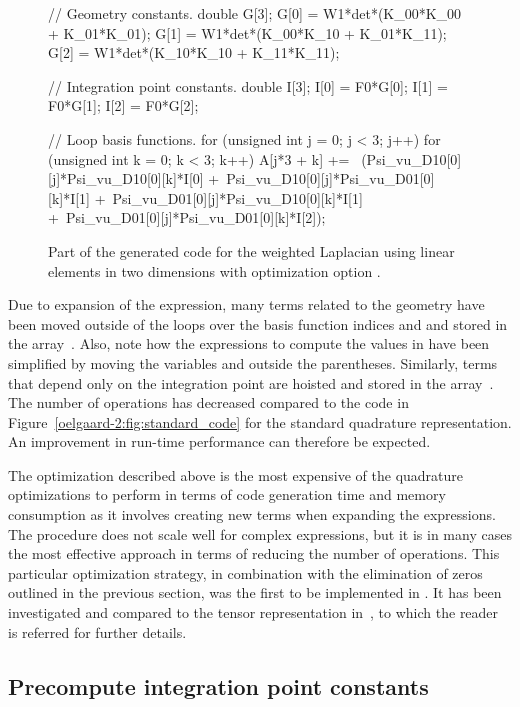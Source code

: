 \begin{figure}
\begin{c++}
// Geometry constants.
double G[3];
G[0] = W1*det*(K_00*K_00 + K_01*K_01);
G[1] = W1*det*(K_00*K_10 + K_01*K_11);
G[2] = W1*det*(K_10*K_10 + K_11*K_11);

// Integration point constants.
double I[3];
I[0] = F0*G[0];
I[1] = F0*G[1];
I[2] = F0*G[2];

// Loop basis functions.
for (unsigned int j = 0; j < 3; j++)
{
 for (unsigned int k = 0; k < 3; k++)
 {
  A[j*3 + k] += \
    (Psi_vu_D10[0][j]*Psi_vu_D10[0][k]*I[0] +\
     Psi_vu_D10[0][j]*Psi_vu_D01[0][k]*I[1] +\
     Psi_vu_D01[0][j]*Psi_vu_D10[0][k]*I[1] +\
     Psi_vu_D01[0][j]*Psi_vu_D01[0][k]*I[2]);
 }
}
\end{c++}
\caption{Part of the generated code for the weighted Laplacian using
  linear elements in two dimensions with optimization option .}
\label{oelgaard-2:fig:O_simplify_code}
\end{figure}

Due to expansion of the expression, many terms related to the geometry
have been moved outside of the loops over the basis function indices
\emp{j} and  and stored in the array~.  Also, note how
the expressions to compute the values in  have been simplified
by moving the variables \emp{det} and \emp{W1} outside the
parentheses.  Similarly, terms that depend only on the integration
point are hoisted and stored in the array~\emp{I}.  The number of
operations has decreased compared to the code in
Figure~\ref{oelgaard-2:fig:standard_code} for the standard quadrature
representation. An improvement in run-time performance can therefore be
expected.

The optimization described above is the most expensive of the
quadrature optimizations to perform in terms of \ffc{} code generation
time and memory consumption as it involves creating new terms when
expanding the expressions.  The
procedure does not scale well for complex expressions, but it is in
many cases the most effective approach in terms of reducing the number
of operations.  This particular optimization strategy, in combination
with the elimination of zeros outlined in the previous section, was
the first to be implemented in \ffc{}.  It has been investigated and
compared to the tensor representation in~\citet{OelgaardWells2010}, to
which the reader is referred for further details.

\subsection{Precompute integration point constants}

